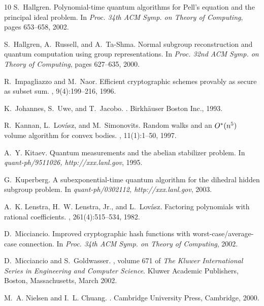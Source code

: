 \documentclass[11pt]{article}
\begin{document}
\begin{thebibliography}{10}
S.~Hallgren.
\newblock Polynomial-time quantum algorithms for {P}ell's equation and the
  principal ideal problem.
\newblock In {\em Proc. 34th ACM Symp. on Theory of Computing}, pages 653--658,
  2002.

S.~Hallgren, A.~Russell, and A.~Ta-Shma.
\newblock Normal subgroup reconstruction and quantum computation using group
  representations.
\newblock In {\em Proc. 32nd ACM Symp. on Theory of Computing}, pages 627--635,
  2000.

R.~Impagliazzo and M.~Naor.
\newblock Efficient cryptographic schemes provably as secure as subset sum.
, 9(4):199--216, 1996.

K.~Johannes, S.~Uwe, and T.~Jacobo.
.
\newblock Birkh\"auser Boston Inc., 1993.

R.~Kannan, L.~Lov{\'a}sz, and M.~Simonovits.
\newblock Random walks and an {$O\sp *(n\sp 5)$} volume algorithm for convex
  bodies.
, 11(1):1--50, 1997.

A.~Y. Kitaev.
\newblock Quantum measurements and the abelian stabilizer problem.
\newblock In {\em quant-ph/9511026, http://xxx.lanl.gov}, 1995.

G.~Kuperberg.
\newblock A subexponential-time quantum algorithm for the dihedral hidden
  subgroup problem.
\newblock In {\em quant-ph/0302112, http://xxx.lanl.gov}, 2003.

A.~K. Lenstra, H.~W. Lenstra, Jr., and L.~Lov{\'a}sz.
\newblock Factoring polynomials with rational coefficients.
, 261(4):515--534, 1982.

D.~Micciancio.
\newblock Improved cryptographic hash functions with worst-case/average-case
  connection.
\newblock In {\em Proc. 34th ACM Symp. on Theory of Computing}, 2002.

D.~Micciancio and S.~Goldwasser.
,
  volume 671 of {\em The Kluwer International Series in Engineering and
  Computer Science}.
\newblock Kluwer Academic Publishers, Boston, Massachusetts, March 2002.

M.~A. Nielsen and I.~L. Chuang.
.
\newblock Cambridge University Press, Cambridge, 2000.


\end{thebibliography}
\end{document}
